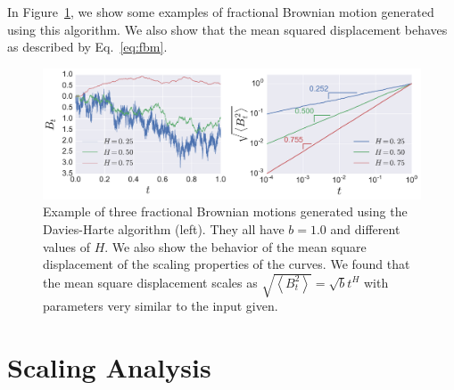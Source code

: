 In Figure~\ref{fig:fbm}, we show some examples of fractional Brownian motion
generated using this algorithm. We also show that the mean squared displacement
behaves as described by Eq.~\ref{eq:fbm}.

\begin{figure}
\begin{center}
    \includegraphics[scale=0.45]{chapters/ch6-asle/figs/fbm}
\end{center}
\caption{Example of three fractional Brownian motions generated using the
    Davies-Harte algorithm (left). They all have $b=1.0$ and different values
    of $H$. We also show the behavior of the mean square displacement of the
    scaling properties of the curves. We found that the mean square displacement
    scales as $\sqrt{\left\langle B_t^2\right\rangle}=\sqrt{b}t^H$ with
    parameters very similar to the input given.}
\label{fig:fbm}
\end{figure}


\section{Scaling Analysis}
\label{sec:scaling}

